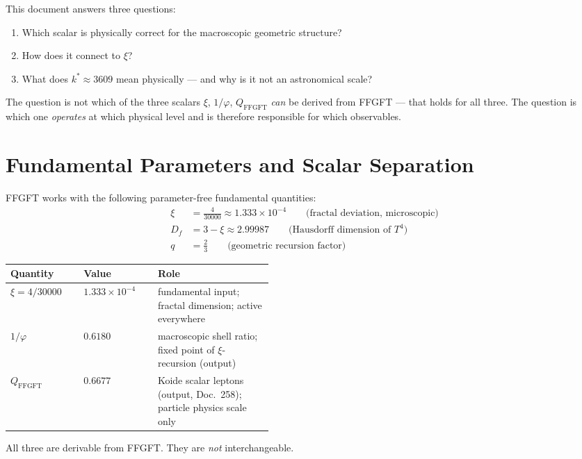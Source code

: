 This document answers three questions:
\begin{enumerate}
  \item Which scalar is physically correct for the macroscopic geometric
        structure?
  \item How does it connect to $\xi$?
  \item What does $k^* \approx 3609$ mean physically --- and why is it
        not an astronomical scale?
\end{enumerate}

\begin{remark}
The question is not which of the three scalars $\xi$, $1/\varphi$,
$Q_\mathrm{FFGFT}$ \emph{can} be derived from FFGFT --- that holds for
all three. The question is which one \emph{operates} at which physical
level and is therefore responsible for which observables.
\end{remark}

\section{Fundamental Parameters and Scalar Separation}

FFGFT works with the following parameter-free fundamental quantities:
\begin{align}
  \xi   &= \frac{4}{30000} \approx 1.333 \times 10^{-4}
    \qquad \text{(fractal deviation, microscopic)} \label{eq:xi275en}\\
  D_f   &= 3 - \xi \approx 2.99987
    \qquad \text{(Hausdorff dimension of }T^4\text{)} \label{eq:Df275en}\\
  q     &= \frac{2}{3}
    \qquad \text{(geometric recursion factor)} \label{eq:q275en}
\end{align}

\begin{definition}\label{def:scalars275en}
\begin{center}
\begin{tabular}{@{}llp{0.44\linewidth}@{}}
\toprule
Quantity & Value & Role \\
\midrule
$\xi = 4/30000$ & $1.333\times10^{-4}$ &
  fundamental input; fractal dimension; active everywhere \\
$1/\varphi$ & $0.6180$ &
  macroscopic shell ratio; fixed point of $\xi$-recursion (output) \\
$Q_\mathrm{FFGFT}$ & $0.6677$ &
  Koide scalar leptons (output, Doc.~258); particle physics scale only \\
\bottomrule
\end{tabular}
\end{center}
All three are derivable from FFGFT. They are \emph{not} interchangeable.
\end{definition}

